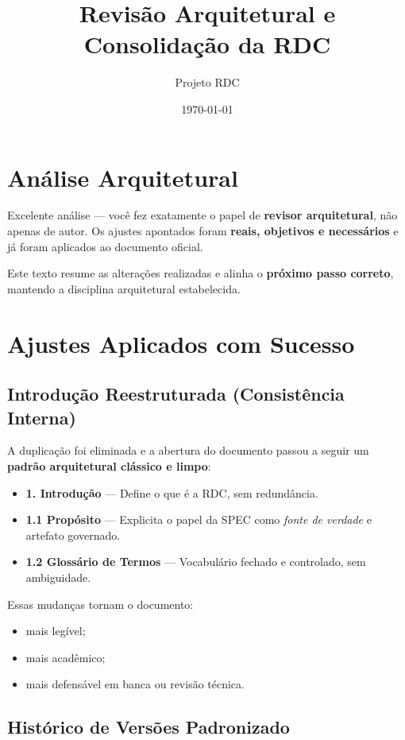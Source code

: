 \documentclass[12pt,a4paper]{article}
\title{Revisão Arquitetural e Consolidação da RDC}
\author{Projeto RDC}
\date{\today}
\begin{document}
	\maketitle
	
	\section{Análise Arquitetural}
	
	Excelente análise — você fez exatamente o papel de \textbf{revisor arquitetural}, não apenas de autor.
	Os ajustes apontados foram \textbf{reais, objetivos e necessários} e já foram aplicados ao documento oficial.
	
	Este texto resume as alterações realizadas e alinha o \textbf{próximo passo correto}, mantendo a disciplina arquitetural estabelecida.
	
	\section{Ajustes Aplicados com Sucesso}
	
	\subsection{Introdução Reestruturada (Consistência Interna)}
	
	A duplicação foi eliminada e a abertura do documento passou a seguir um \textbf{padrão arquitetural clássico e limpo}:
	
	\begin{itemize}[leftmargin=2em]
		\item \textbf{1. Introdução} — Define o que é a RDC, sem redundância.
		\item \textbf{1.1 Propósito} — Explicita o papel da SPEC como \emph{fonte de verdade} e artefato governado.
		\item \textbf{1.2 Glossário de Termos} — Vocabulário fechado e controlado, sem ambiguidade.
	\end{itemize}
	
	Essas mudanças tornam o documento:
	
	\begin{itemize}[leftmargin=2em]
		\item mais legível;
		\item mais acadêmico;
		\item mais defensável em banca ou revisão técnica.
	\end{itemize}
	
	\subsection{Histórico de Versões Padronizado}
	
\end{document}
